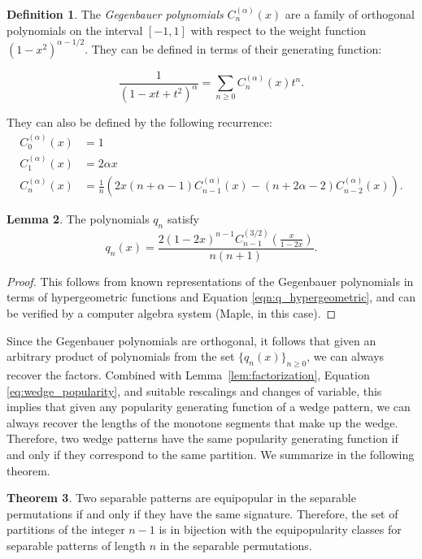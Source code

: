 \documentclass[10pt]{article}
\theoremstyle{definition}
\newtheorem{theorem}{Theorem}[section]
\newtheorem{definition}[theorem]{Definition}
\newtheorem{lemma}[theorem]{Lemma}
\numberwithin{equation}{section}
\numberwithin{figure}{section}
\begin{document}
  \begin{definition}
    The \emph{Gegenbauer polynomials} $C_n^{(\alpha)}(x)$ are a family of orthogonal polynomials on the interval $[-1,1]$ with respect to the weight function $(1-x^2)^{\alpha-1/2}$. They can be defined in terms of their generating function:

\[
\frac{1}{(1-xt+t^2)^\alpha} = \sum_{n \geq 0} C_n^{(\alpha)}(x)t^n.
\]

They can also be defined by the following recurrence:
\[
\begin{aligned}
    C_0^{(\alpha)}(x) &= 1 \\
    C_1^{(\alpha)}(x) &= 2\alpha x \\
    C_n^{(\alpha)}(x) &= \frac{1}{n} \left(2x(n+\alpha - 1) C_{n-1}^{(\alpha)}(x)
      - (n+2\alpha - 2) C_{n-2}^{(\alpha)}(x) \right).
\end{aligned}
\]
\end{definition}

\begin{lemma}
The polynomials $q_n$ satisfy
\[
q_n(x) = \frac{2(1-2x)^{n-1} C_{n-1}^{(3/2)}\left(\frac{x}{1-2x}\right)}
                    {n(n+1)}. 
\]
\end{lemma}
  \begin{proof}
    This follows from known representations of the Gegenbauer polynomials in terms of hypergeometric functions and Equation \ref{eqn:q_hypergeometric}, and can be verified by a computer algebra system (Maple, in this case). 
  \end{proof}

Since the Gegenbauer polynomials are orthogonal, it follows that given an arbitrary product of polynomials from the set $\{q_n(x)\}_{n\geq 0}$, we can always recover the factors. Combined with Lemma~\ref{lem:factorization}, Equation \ref{eq:wedge_popularity}, and suitable rescalings and changes of variable, this implies that given any popularity generating function of a wedge pattern, we can always recover the lengths of the monotone segments that make up the wedge. Therefore, two wedge patterns have the same popularity generating function if and only if they correspond to the same partition. We summarize in the following theorem.

\begin{theorem}\label{thm:main-result}
Two separable patterns are equipopular in the separable permutations if and only if they have the same signature. Therefore, the set of partitions of the integer $n-1$ is in bijection with the equipopularity classes for separable patterns of length $n$ in the separable permutations. 
\end{theorem}
\end{document}
